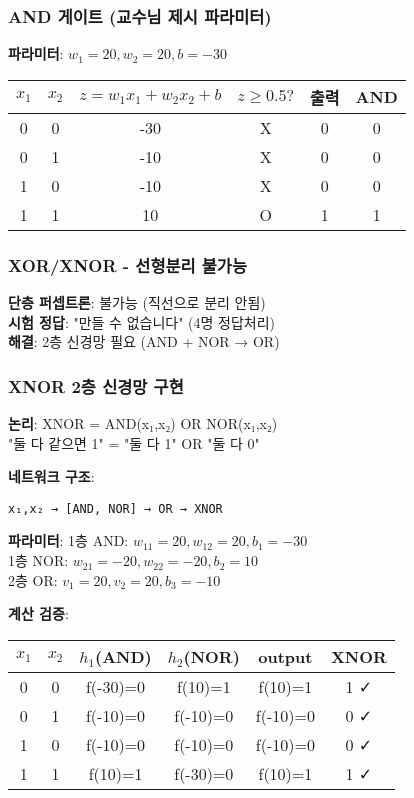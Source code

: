 \documentclass[6pt,landscape,a4paper]{article}
\begin{document}
\begin{multicols}{3}
\subsubsection{AND 게이트 (교수님 제시 파라미터)}
\textbf{파라미터}: $w_1=20, w_2=20, b=-30$

\begin{tabular}{|c|c|c|c|c|c|}
\hline
$x_1$ & $x_2$ & $z=w_1x_1+w_2x_2+b$ & $z \geq 0.5?$ & 출력 & AND \\
\hline
0 & 0 & -30 & X & 0 & 0 \\
0 & 1 & -10 & X & 0 & 0 \\
1 & 0 & -10 & X & 0 & 0 \\
1 & 1 & 10 & O & 1 & 1 \\
\hline
\end{tabular}
\subsubsection{XOR/XNOR - 선형분리 불가능}
\textbf{단층 퍼셉트론}: 불가능 (직선으로 분리 안됨)\\
\textbf{시험 정답}: "만들 수 없습니다" (4명 정답처리)\\
\textbf{해결}: 2층 신경망 필요 (AND + NOR → OR)

\subsubsection{XNOR 2층 신경망 구현}
\textbf{논리}: XNOR = AND(x₁,x₂) OR NOR(x₁,x₂)\\
"둘 다 같으면 1" = "둘 다 1" OR "둘 다 0"

\textbf{네트워크 구조}:
\begin{verbatim}
x₁,x₂ → [AND, NOR] → OR → XNOR
\end{verbatim}

\textbf{파라미터}:
1층 AND: $w_{11}=20, w_{12}=20, b_1=-30$\\
1층 NOR: $w_{21}=-20, w_{22}=-20, b_2=10$\\
2층 OR: $v_1=20, v_2=20, b_3=-10$

\textbf{계산 검증}:\\
\begin{tabular}{|c|c|c|c|c|c|}
\hline
$x_1$ & $x_2$ & $h_1$(AND) & $h_2$(NOR) & output & XNOR \\
\hline
0 & 0 & f(-30)=0 & f(10)=1 & f(10)=1 & 1 ✓ \\
0 & 1 & f(-10)=0 & f(-10)=0 & f(-10)=0 & 0 ✓ \\
1 & 0 & f(-10)=0 & f(-10)=0 & f(-10)=0 & 0 ✓ \\
1 & 1 & f(10)=1 & f(-30)=0 & f(10)=1 & 1 ✓ \\
\hline
\end{tabular}


\end{multicols}
\end{document}
